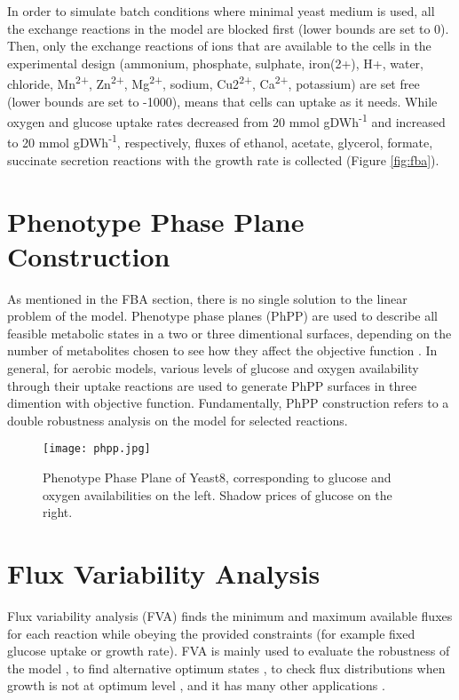 In order to simulate batch conditions where minimal yeast medium is used, all the exchange reactions in the model are blocked first (lower bounds are set to 0). Then, only the exchange reactions of ions that are available to the cells in the experimental design (ammonium, phosphate, sulphate, iron(2+), H+, water, chloride, Mn\textsuperscript{2+}, Zn\textsuperscript{2+}, Mg\textsuperscript{2+}, sodium, Cu2\textsuperscript{2+}, Ca\textsuperscript{2+}, potassium) are set free (lower bounds are set to -1000), means that cells can uptake as it needs. While oxygen and glucose uptake rates decreased from 20 mmol gDWh\textsuperscript{-1} and increased to 20 mmol gDWh\textsuperscript{-1}, respectively, fluxes of ethanol, acetate, glycerol, formate, succinate secretion reactions with the growth rate is collected (Figure \ref{fig:fba}).


\section{Phenotype Phase Plane Construction}

As mentioned in the FBA section, there is no single solution to the linear problem of the model. Phenotype phase planes (PhPP) are used to describe all feasible metabolic states in a two or three dimentional surfaces, depending on the number of metabolites chosen to see how they affect the objective function \cite{edwards2002characterizing}. In general, for aerobic models, various levels of glucose and oxygen availability through their uptake reactions are used to generate PhPP surfaces in three dimention with objective function. Fundamentally, PhPP construction refers to a double robustness analysis on the model for selected reactions.

\begin{figure}[H]
\begin{center}
\texttt{[image: phpp.jpg]}
\end{center}
\caption[Phenotype Phase Plane of Yeast8]{Phenotype Phase Plane of Yeast8, corresponding to glucose and oxygen availabilities on the left. Shadow prices of glucose on the right.}
\label{fig:phpp}
\end{figure}


\section{Flux Variability Analysis}
Flux variability analysis (FVA) finds the minimum and maximum available fluxes for each reaction while obeying the provided constraints (for example fixed glucose uptake or growth rate). FVA is mainly used to evaluate the robustness of the model \cite{thiele2010functional}, to find alternative optimum states \cite{mahadevan2003effects}, to check flux distributions when growth is not at optimum level \cite{reed2004genome}, and it has many other applications \cite{gudmundsson2010computationally}.

